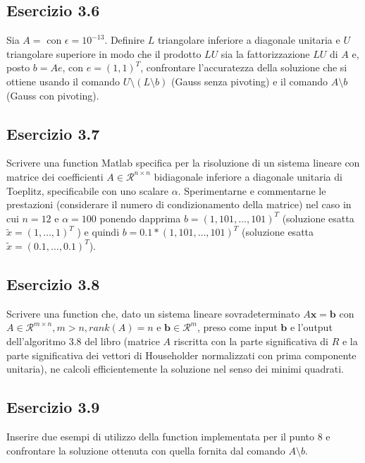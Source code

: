 \TODO


	\subsection{Esercizio 3.6}

Sia $A = $ con $\epsilon = 10^{-13}$. Definire $L$ triangolare inferiore a diagonale unitaria e $U$ triangolare superiore in modo che il prodotto $LU$ sia la fattorizzazione $LU$ di $A$ e, posto $b = Ae$, con $e = (1, 1)^T$, confrontare l'accuratezza della soluzione che si ottiene usando il comando $U\setminus(L\setminus b)$ (Gauss senza pivoting) e il comando $A\setminus b$ (Gauss con pivoting).

\TODO


	\subsection{Esercizio 3.7}
Scrivere una function Matlab specifica per la risoluzione di un sistema lineare con matrice dei coefficienti $A \in \mathcal{R}^{n \times n}$ bidiagonale inferiore a diagonale unitaria di Toeplitz, specificabile con uno scalare $\alpha$. Sperimentarne e commentarne le prestazioni (considerare il numero di condizionamento della matrice) nel caso in cui $n = 12$ e $\alpha =100$ ponendo dapprima $b = (1, 101, \dots , 101)^T$ (soluzione esatta $\tilde{x} = (1, \dots , 1)^T$ ) e quindi $b = 0.1 * (1, 101, \dots , 101)^T$ (soluzione esatta $\tilde{x} = (0.1, \dots , 0.1)^T$).

\TODO


	\subsection{Esercizio 3.8}
Scrivere una function che, dato un sistema lineare sovradeterminato $A\mathbf{x}=\mathbf{b}$ con $A \in \mathcal{R}^{m \times n}, m > n, rank(A) = n$ e $\mathbf{b} \in \mathcal{R}^m$, preso come input $\mathbf{b}$ e l'output dell'algoritmo 3.8 del libro (matrice $A$ riscritta con la parte significativa di $R$ e la parte significativa dei vettori di Householder normalizzati con prima componente unitaria), ne calcoli efficientemente la soluzione nel senso dei minimi quadrati.

\TODO


 
	\subsection{Esercizio 3.9}
Inserire due esempi di utilizzo della function implementata per il punto 8 e confrontare la soluzione ottenuta con quella fornita dal comando $A\setminus b$.

